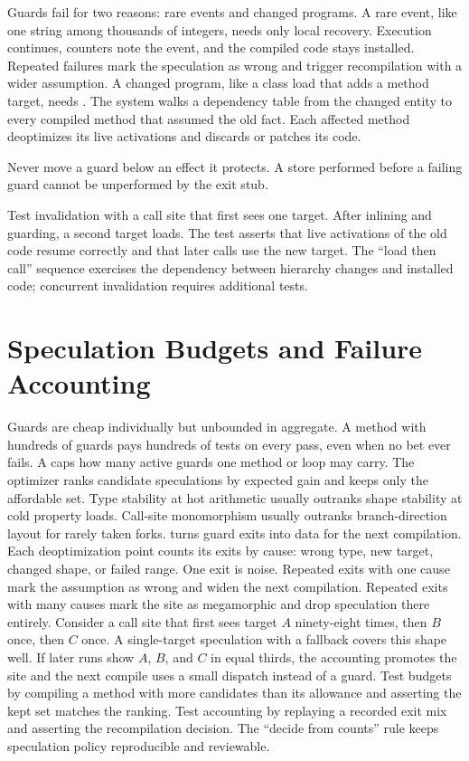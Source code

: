 Guards fail for two reasons: rare events and changed programs.
A rare event, like one string among thousands of integers, needs only local recovery.
Execution continues, counters note the event, and the compiled code stays installed.
Repeated failures mark the speculation as wrong and trigger recompilation with a wider assumption.
A changed program, like a class load that adds a method target, needs .
The system walks a dependency table from the changed entity to every compiled method that assumed the old fact.
Each affected method deoptimizes its live activations and discards or patches its code.
\begin{ccwarning}
Never move a guard below an effect it protects.
A store performed before a failing guard cannot be unperformed by the exit stub.
\end{ccwarning}
Test invalidation with a call site that first sees one target.
After inlining and guarding, a second target loads.
The test asserts that live activations of the old code resume correctly and that later calls use the new target.
The \enquote{load then call} sequence exercises the dependency between hierarchy changes and installed code; concurrent invalidation requires additional tests.

\section{Speculation Budgets and Failure Accounting}\label{sec:ch35-budgets}

Guards are cheap individually but unbounded in aggregate.
A method with hundreds of guards pays hundreds of tests on every pass, even when no bet ever fails.
A  caps how many active guards one method or loop may carry.
The optimizer ranks candidate speculations by expected gain and keeps only the affordable set.
Type stability at hot arithmetic usually outranks shape stability at cold property loads.
Call-site monomorphism usually outranks branch-direction layout for rarely taken forks.
 turns guard exits into data for the next compilation.
Each deoptimization point counts its exits by cause: wrong type, new target, changed shape, or failed range.
One exit is noise.
Repeated exits with one cause mark the assumption as wrong and widen the next compilation.
Repeated exits with many causes mark the site as megamorphic and drop speculation there entirely.
Consider a call site that first sees target $A$ ninety-eight times, then $B$ once, then $C$ once.
A single-target speculation with a fallback covers this shape well.
If later runs show $A$, $B$, and $C$ in equal thirds, the accounting promotes the site and the next compile uses a small dispatch instead of a guard.
Test budgets by compiling a method with more candidates than its allowance and asserting the kept set matches the ranking.
Test accounting by replaying a recorded exit mix and asserting the recompilation decision.
The \enquote{decide from counts} rule keeps speculation policy reproducible and reviewable.

